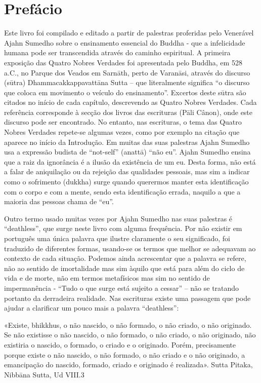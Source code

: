 \chapter{Prefácio}

Este livro foi compilado e editado a partir de palestras
proferidas pelo Venerável Ajahn Sumedho sobre o ensinamento essencial do Buddha - que a infelicidade humana pode
ser transcendida através do caminho espiritual.
A primeira exposição das Quatro Nobres Verdades foi
apresentada pelo Buddha, em 528 a.C., no Parque dos Veados
em Sarnāth, perto de Varanāsi, através do discurso (sūtra) Dhammacakkappavattāna Sutta – que literalmente significa
“o discurso que coloca em movimento o veículo do ensinamento”. Excertos deste sūtra são citados no início de cada
capítulo, descrevendo as Quatro Nobres Verdades. Cada
referência corresponde à secção dos livros das escrituras (Pāli
Cânon), onde este discurso pode ser encontrado. No entanto,
nas escrituras, o tema das Quatro Nobres Verdades repete-se
algumas vezes, como por exemplo na citação que aparece no
início da Introdução.
Em muitas das suas palestras Ajahn Sumedho usa a
expressão budista de “not-self” (anattā) “não eu”. Ajahn
Sumedho ensina que a raiz da ignorância é a ilusão da existência de um eu. Desta forma, não está a falar de aniquilação ou
da rejeição das qualidades pessoais, mas sim a indicar como o
sofrimento (dukkha) surge quando querermos manter esta identificação com o corpo e com a mente, sendo esta identificação errada, naquilo a que a maioria das pessoas chama de “eu”.

Outro termo usado muitas vezes por Ajahn Sumedho nas
suas palestras é “deathless”, que surge neste livro com alguma
frequência. Por não existir em português uma única palavra
que ilustre claramente o seu significado, foi traduzido de
diferentes formas, usando-se os termos que melhor se adequavam ao contexto de cada situação. Podemos ainda acrescentar
que a palavra se refere, não ao sentido de imortalidade mas
sim àquilo que está para além do ciclo de vida e de morte, não
em termos metafísicos mas sim no sentido de impermanência
- “Tudo o que surge está sujeito a cessar” – não se tratando
portanto da derradeira realidade. Nas escrituras existe uma
passagem que pode ajudar a clarificar um pouco mais a
palavra “deathless”:

«Existe, bhikkhus, o não nascido, o não formado,
o não criado, o não originado. Se não existisse o
não nascido, o não formado, o não criado, o não
originado, não existiria o nascido, o formado, o
criado e o originado. Porém, precisamente porque
existe o não nascido, o não formado, o não criado
e o não originado, a emancipação do nascido, formado, criado e originado é realizada».
Sutta Pitaka, Nibbāna Sutta, Ud VIII.3

